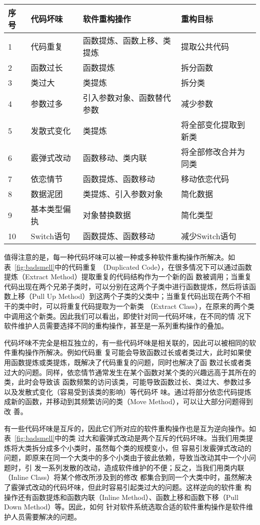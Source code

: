 \begin{center}
\label{fig:badsmell}
\begin{tabular}{|l|l|l|l|}
\hline
序号 & 代码坏味 & 软件重构操作 & 重构目标\\ \hline
1 & 代码重复 & 函数提炼、函数上移、类提炼 & 提取公共代码\\ \hline
2 & 函数过长 & 函数提炼 & 拆分函数\\ \hline
3 & 类过大 & 类提炼 & 拆分类\\ \hline
4 & 参数过多 & 引入参数对象、函数替代参数 & 减少参数\\ \hline
5 & 发散式变化& 类提炼 & 将全部变化提取到新类\\ \hline
6 & 霰弹式改动& 函数移动、类内联 & 将全部修改合并为同类\\ \hline
7 & 依恋情节& 函数提炼、函数移动 & 移动依恋代码\\ \hline
8 & 数据泥团& 类提炼、引入参数对象 & 简化数据\\ \hline
9 & 基本类型偏执& 对象替换数据 & 简化类型 \\ \hline
10 & Switch语句 & 函数提炼、函数移动 & 减少Switch语句\\ \hline
\end{tabular}
\end{center}

值得注意的是，每一种代码坏味可以被一种或多种软件重构操作所解决。如表~\ref{fig:badsmell}中的代码重复
（Duplicated Code），在很多情况下可以通过函数提炼（Extract Method）提取重复的代码结构作为一个新的函
数被调用；当重复代码出现在两个兄弟子类时，可以分别在这两个子类中进行函数提炼，然后将该函数上移（Pull
Up Method）到这两个子类的父类中；当重复代码出现在两个不相干的类中时，可以将重复代码提取为一个新类
（Extract Class），在原来的两个类中调用这个新类。因此我们可以看出，即使针对同一代码坏味，在不同的情
况下软件维护人员需要选择不同的重构操作，甚至是一系列重构操作的叠加。

代码坏味不完全是相互独立的，有一些代码坏味是相关联的，因此可以被相同的软件重构操作所解决。例如代码重
复可能会导致函数过长或者类过大，此时如果使用函数提炼或类提炼，既解决了代码重复的问题，同时也解决了函
数过长或者类过大的问题。同样，依恋情节通常发生在某个函数对某个类的兴趣远高于其所在的类，此时会导致该
函数频繁的访问该类，可能导致函数过长、类过大、参数过多以及发散式变化（容易受到该类的影响）等代码坏
味。通过将部分依恋代码提炼成新的函数，并移动到其频繁访问的类（Move Method），可以让大部分问题得到改
善。

有一些代码坏味是互斥的，因此它们所对应的软件重构操作也是互为逆向操作。如表~\ref{fig:badsmell}中的类
过大和霰弹式改动是两个互斥的代码坏味。当我们用类提炼将大类拆分成多个小类时，虽然每个类的规模变小，但
容易引发霰弹式改动的问题，即原来在同一个大类中的多个小类由于彼此依赖，导致当改动其中一个小问题时，引
发一系列发散的改动，造成软件维护的不便；反之，当我们用类内联（Inline Class）将某个修改所涉及到的修改
都集合到同一个大类中时，虽然解决了霰弹式改动的代码坏味，但此时容易引起类过大的问题。这样逆向的软件重
构操作还有函数提炼和函数内联（Inline Method）、函数上移和函数下移（Pull Down Method）等。因此，如何
针对软件系统选取合适的软件重构操作是软件维护人员需要解决的问题。

